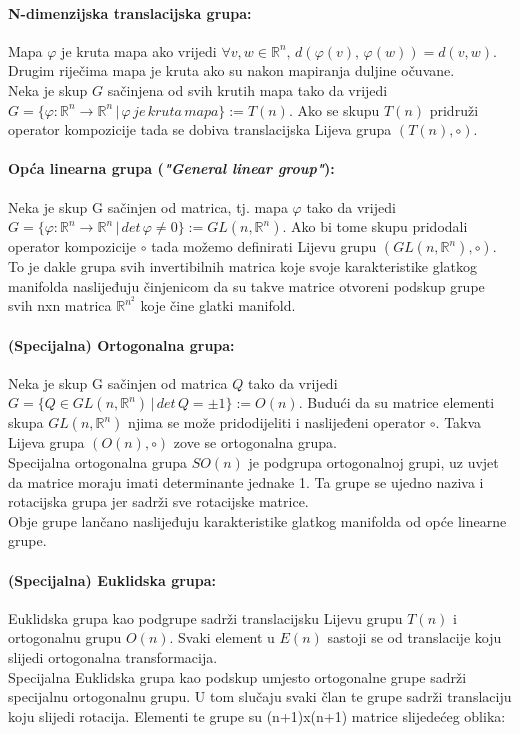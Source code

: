 \documentclass[times, utf8, diplomski]{fer}
\begin{document}
	\paragraph{N-dimenzijska translacijska grupa:} Mapa $\varphi$ je kruta mapa ako vrijedi 
	$\forall v, w \in \mathbb{R}^n, \, d(\varphi(v), \, \varphi(w)) = d(v, w)$. Drugim riječima mapa je kruta ako su nakon mapiranja duljine očuvane. \\
	Neka je skup $G$ sačinjena od svih krutih mapa tako da vrijedi $G = \{ \varphi: \mathbb{R}^n \rightarrow \mathbb{R}^n \, | \, \varphi\, je\, kruta\, mapa\} := T(n)$. Ako se skupu $T(n)$ pridruži operator kompozicije tada se dobiva translacijska Lijeva grupa $(T(n), \circ)$.
	
	\paragraph{Opća linearna grupa (\textit{"General linear group"}):} Neka je skup G sačinjen od matrica, tj. mapa $\varphi$ tako da vrijedi $G = \{ \varphi: \mathbb{R}^n \rightarrow \mathbb{R}^n \,|\, det \, \varphi \neq 0 \}:=GL(n, \mathbb{R}^n)$. Ako bi tome skupu pridodali operator kompozicije $\circ$ tada možemo definirati Lijevu grupu $(GL(n, \mathbb{R}^n), \circ)$. To je dakle grupa svih invertibilnih matrica koje svoje karakteristike glatkog manifolda naslijeđuju činjenicom da su takve matrice otvoreni podskup grupe svih nxn matrica $\mathbb{R}^{n^2}$ koje čine glatki manifold.
	
	\paragraph{(Specijalna) Ortogonalna grupa:} Neka je skup G sačinjen od matrica $Q$ tako da vrijedi \\ 
	$G = \{ Q \in GL(n, \mathbb{R}^n) \,|\, det \, Q = \pm 1\} := O(n)$. Budući da su matrice elementi skupa $GL(n, \mathbb{R}^n)$ njima se može pridodijeliti i naslijeđeni operator $\circ$. Takva Lijeva grupa $(O(n),\circ)$ zove se ortogonalna grupa. \\
	Specijalna ortogonalna grupa $SO(n)$ je podgrupa ortogonalnoj grupi, uz uvjet da matrice moraju imati determinante jednake 1. Ta grupe se ujedno naziva i rotacijska grupa jer sadrži sve rotacijske matrice. \\
	Obje grupe lančano naslijeđuju karakteristike glatkog manifolda od opće linearne grupe.
	
	\paragraph{(Specijalna) Euklidska grupa:} Euklidska grupa kao podgrupe sadrži translacijsku Lijevu grupu $T(n)$ i ortogonalnu grupu $O(n)$. Svaki element u $E(n)$ sastoji se od translacije koju slijedi ortogonalna transformacija. \\
	Specijalna Euklidska grupa kao podskup umjesto ortogonalne grupe sadrži specijalnu ortogonalnu grupu. U tom slučaju svaki član te grupe sadrži translaciju koju slijedi rotacija. Elementi te grupe su (n+1)x(n+1) matrice slijedećeg oblika: \\
	
\end{document}
